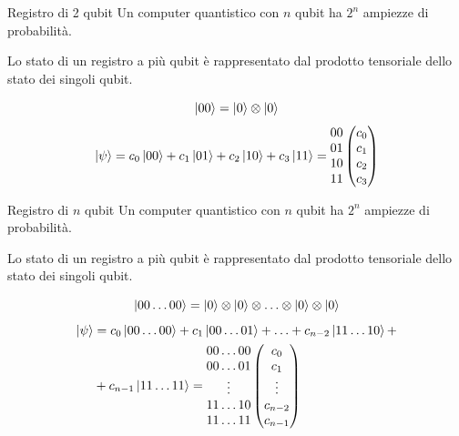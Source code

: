 \documentclass{beamer}
\begin{document}
    \begin{frame}{Registro di 2 qubit}
        Un computer quantistico con $n$ qubit ha $2^n$ ampiezze di probabilità. 

        Lo stato di un registro a più qubit è rappresentato dal prodotto tensoriale dello stato dei singoli qubit. 

        \begin{equation*}
            \ket{00} = \ket{0} \otimes \ket{0}
        \end{equation*}
        \begin{equation*}
            \ket{\psi} = c_0 \ket{00} + c_1 \ket{01} + c_2 \ket{10} + c_3 \ket{11} = 
            \begin{matrix}
                00 \\ 01 \\ 10 \\ 11
            \end{matrix} \begin{pmatrix}
                c_0 \\ c_1 \\ c_2 \\ c_3
            \end{pmatrix}
        \end{equation*}  
    \end{frame}

    \begin{frame}{Registro di $n$ qubit}
        Un computer quantistico con $n$ qubit ha $2^n$ ampiezze di probabilità. 

        Lo stato di un registro a più qubit è rappresentato dal prodotto tensoriale dello stato dei singoli qubit. 

        \begin{equation*}
            \ket{00\ldots00} = \ket{0} \otimes \ket{0} \otimes \ldots \otimes \ket{0} \otimes \ket{0}
        \end{equation*}
        \begin{equation*}
            \begin{split}
                \ket{\psi} &= c_0 \ket{00\ldots00} + c_1 \ket{00\ldots01} + \ldots + c_{n-2} \ket{11\ldots10} + \\ 
                &+ c_{n-1} \ket{11\ldots11} = \begin{matrix}
                00\ldots00 \\ 00\ldots01 \\ \vdots \\ 11\ldots10 \\ 11\ldots11
            \end{matrix} \begin{pmatrix}
                c_0 \\ c_1 \\ \vdots \\ c_{n-2} \\ c_{n-1}
            \end{pmatrix}
            \end{split}
        \end{equation*}
    \end{frame}
\end{document}

